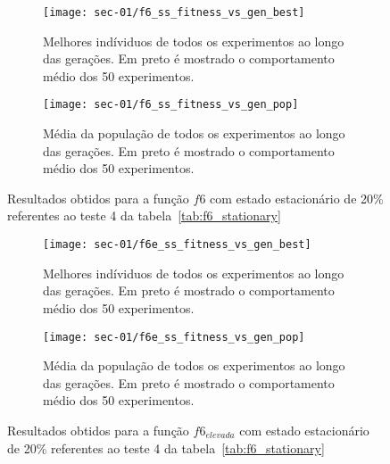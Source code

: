 	\begin{figure}[!htb]
		\begin{subfigure}{.45\textwidth}
			\centering
			\texttt{[image: sec-01/f6\_ss\_fitness\_vs\_gen\_best]}
			\caption{Melhores indíviduos de todos os experimentos ao longo das gerações.
			Em preto é mostrado o comportamento médio dos 50 experimentos. }
		\end{subfigure}
		\hfill
		\begin{subfigure}{.45\textwidth}
			\centering
			\texttt{[image: sec-01/f6\_ss\_fitness\_vs\_gen\_pop]}
			\caption{Média da população de todos os experimentos ao longo das gerações.
			Em preto é mostrado o comportamento médio dos 50 experimentos.}
		\end{subfigure}
		\caption{Resultados obtidos para a função $f6$ com estado estacionário de 20\% referentes ao teste 4 da tabela~\ref{tab:f6_stationary}}
	\end{figure}

	\begin{figure}[!htb]
		\begin{subfigure}{.45\textwidth}
			\centering
			\texttt{[image: sec-01/f6e\_ss\_fitness\_vs\_gen\_best]}
			\caption{Melhores indíviduos de todos os experimentos ao longo das gerações.
			Em preto é mostrado o comportamento médio dos 50 experimentos. }
		\end{subfigure}
		\hfill
		\begin{subfigure}{.45\textwidth}
			\centering
			\texttt{[image: sec-01/f6e\_ss\_fitness\_vs\_gen\_pop]}
			\caption{Média da população de todos os experimentos ao longo das gerações.
			Em preto é mostrado o comportamento médio dos 50 experimentos.}
		\end{subfigure}
		\caption{Resultados obtidos para a função $f6_{elevada}$ com estado estacionário de 20\% referentes ao teste 4 da tabela~\ref{tab:f6_stationary}}
	\end{figure}